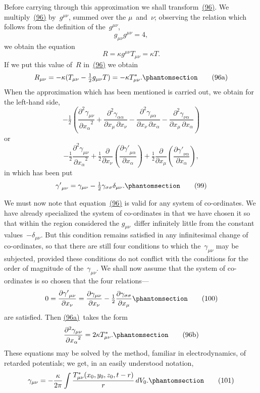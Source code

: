 \documentclass[12pt]{book}[2005/09/16]
\newcommand{\Change}[2]{#2}
\newcommand{\Add}[1]{\Change{}{#1}}
\newcommand{\PageSep}[1]{\ignorespaces}
\newcommand{\Tag}[1]{%
  \phantomsection
  \label{eqn:#1}
  \tag*{#1}
}
\newcommand{\Eqref}[1]{\hyperref[eqn:#1]{#1}}
\newcommand{\dd}{\partial}
\begin{document}
Before carrying through this approximation we shall
\PageSep{95}
transform~\Eqref{(96)}. We multiply~\Eqref{(96)} by~$g^{\mu\nu}$, summed over
the $\mu$~and~$\nu$; observing the relation which follows from
the definition of the~$g^{\mu\nu}$,
\[
g_{\mu\nu} g^{\mu\nu} = 4\Add{,}
\]
we obtain the equation
\[
R = \kappa g^{\mu\nu} T_{\mu\nu} = \kappa T.
\]
If we put this value of~$R$ in~\Eqref{(96)} we obtain
\[
R_{\mu\nu} = -\kappa (T_{\mu\nu} - \tfrac{1}{2}g_{\mu\nu} T)
  = -\kappa T_{\mu\nu}^{*}\Add{.}
\Tag{(96a)}
\]
When the approximation which has been mentioned is
carried out, we obtain for the left-hand side,
\[
-\tfrac{1}{2}\left(
    \frac{\dd^{2} \gamma_{\mu\nu}}{{\dd x_{\alpha}}^{2}}
  + \frac{\dd^{2} \gamma_{\alpha\alpha}}{\dd x_{\mu}\, \dd x_{\nu}}
  - \frac{\dd^{2} \gamma_{\mu\alpha}}{\dd x_{\nu}\, \dd x_{\alpha}}
  - \frac{\dd^{2} \gamma_{\nu\alpha}}{\dd x_{\mu}\, \dd x_{\alpha}}
\right)
\]
or
\[
-\tfrac{1}{2}\frac{\dd^{2} \gamma_{\mu\nu}}{{\dd x_{\alpha}}^{2}}
  + \tfrac{1}{2} \frac{\dd}{\dd x_{\nu}}\left(
    \frac{{\dd \gamma'}_{\mu\alpha}}{\dd x_{\alpha}}
  \right)
  + \tfrac{1}{2} \frac{\dd}{\dd x_{\mu}}\left(
    \frac{{\dd \gamma'}_{\nu\alpha}}{\dd x_{\alpha}}
  \right)\Add{,}
\]
in which has been put
\[
{\gamma'}_{\mu\nu}
  = \gamma_{\mu\nu} - \tfrac{1}{2}\gamma_{\sigma\sigma}\delta_{\mu\nu}\Add{.}
\Tag{(99)}
\]

We must now note that equation~\Eqref{(96)} is valid for any
system of co-ordinates. We have already specialized the
system of co-ordinates in that we have chosen it so that
within the region considered the $g_{\mu\nu}$~differ infinitely little
from the constant values~$-\delta_{\mu\nu}$. But this condition
remains satisfied in any infinitesimal change of co-ordinates,
so that there are still four conditions to which
the~$\gamma_{\mu\nu}$ may be subjected, provided these conditions do
not conflict with the conditions for the order of magnitude
\PageSep{96}
of the~$\gamma_{\mu\nu}$. We shall now assume that the system of co-ordinates
is so chosen that the four relations---
\[
0 = \frac{{\dd\gamma'}_{\mu\nu}}{\dd x_{\nu}}
  = \frac{\dd\gamma_{\mu\nu}}{\dd x_{\nu}}
  - \tfrac{1}{2} \frac{\dd\gamma_{\sigma\sigma}}{\dd x_{\mu}}
\Tag{(100)}
\]
are satisfied. Then \Eqref{(96a)}~takes the form
\[
\frac{\dd^{2} \gamma_{\mu\nu}}{{\dd x_{\alpha}}^{2}} = 2\kappa T_{\mu\nu}^{*}\Add{.}
\Tag{(96b)}
\]
These equations may be solved by the method, familiar
in electrodynamics, of retarded potentials; we get, in an
easily understood notation,
\[
\gamma_{\mu\nu} = -\frac{\kappa}{2\pi} \int
  \frac{T_{\mu\nu}^{*}(x_{0}, y_{0}, z_{0}, t - r)}{r}\, dV_{0}\Add{.}
\Tag{(101)}
\]
\end{document}
